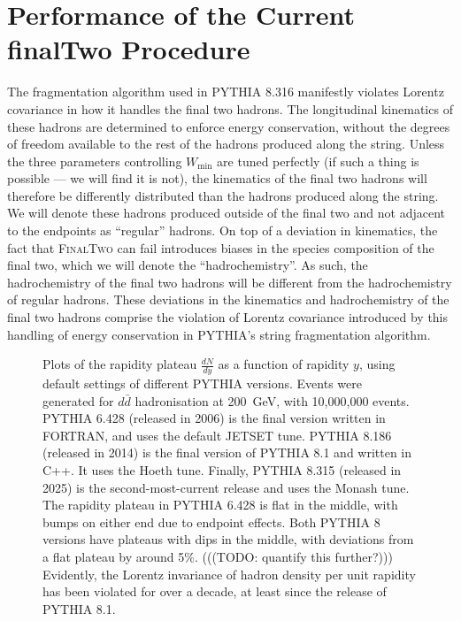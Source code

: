 \documentclass[12pt,a4paper]{report}
\begin{document}
\section{Performance of the Current finalTwo Procedure}
The fragmentation algorithm used in PYTHIA 8.316 manifestly violates Lorentz covariance in how it handles the final two hadrons. The longitudinal kinematics of these hadrons are determined to enforce energy conservation, without the degrees of freedom available to the rest of the hadrons produced along the string. Unless the three parameters controlling $W_\text{min}$ are tuned perfectly (if such a thing is possible --- we will find it is not), the kinematics of the final two hadrons will therefore be differently distributed than the hadrons produced along the string. We will denote these hadrons produced outside of the final two and not adjacent to the endpoints as ``regular'' hadrons. On top of a deviation in kinematics, the fact that \textsc{FinalTwo} can fail introduces biases in the species composition of the final two, which we will denote the ``hadrochemistry''. As such, the hadrochemistry of the final two hadrons will be different from the hadrochemistry of regular hadrons. These deviations in the kinematics and hadrochemistry of the final two hadrons comprise the violation of Lorentz covariance introduced by this handling of energy conservation in PYTHIA's string fragmentation algorithm.

\begin{figure}
  \centering
  
  \caption{Plots of the rapidity plateau $\frac{dN}{dy}$ as a function of rapidity $y$, using default settings of different PYTHIA versions. Events were generated for $d\bar{d}$ hadronisation at \qty{200}{\giga\electronvolt}, with 10,000,000 events. PYTHIA 6.428 (released in 2006) is the final version written in FORTRAN, and uses the default JETSET tune. PYTHIA 8.186 (released in 2014) is the final version of PYTHIA 8.1 and written in C++. It uses the Hoeth tune. Finally, PYTHIA 8.315 (released in 2025) is the second-most-current release and uses the Monash tune. The rapidity plateau in PYTHIA 6.428 is flat in the middle, with bumps on either end due to endpoint effects. Both PYTHIA 8 versions have plateaus with dips in the middle, with deviations from a flat plateau by around 5\%. (((TODO: quantify this further?))) Evidently, the Lorentz invariance of hadron density per unit rapidity has been violated for over a decade, at least since the release of PYTHIA 8.1.}
  \label{fig:version-plots}
\end{figure}
\end{document}
